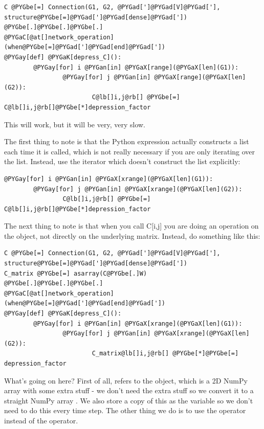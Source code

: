 \documentclass[letterpaper,10pt]{manual}
\begin{document}
\begin{Verbatim}[commandchars=@\[\]]
C @PYGbe[=] Connection(G1, G2, @PYGad[']@PYGad[V]@PYGad['], structure@PYGbe[=]@PYGad[']@PYGad[dense]@PYGad['])
@PYGbe[.]@PYGbe[.]@PYGbe[.]
@PYGaC[@at[]network_operation](when@PYGbe[=]@PYGad[']@PYGad[end]@PYGad['])
@PYGay[def] @PYGaK[depress_C]():
        @PYGay[for] i @PYGan[in] @PYGaX[range](@PYGaX[len](G1)):
                @PYGay[for] j @PYGan[in] @PYGaX[range](@PYGaX[len](G2)):
                        C@lb[]i,j@rb[] @PYGbe[=] C@lb[]i,j@rb[]@PYGbe[*]depression_factor
\end{Verbatim}

This will work, but it will be very, very slow.

The first thing to note is that the Python expression 
actually constructs a list \code{{[}0,1,2,...,N-1{]}} each time it is called,
which is not really necessary if you are only iterating over the list.
Instead, use the  iterator which doesn't construct the list
explicitly:

\begin{Verbatim}[commandchars=@\[\]]
@PYGay[for] i @PYGan[in] @PYGaX[xrange](@PYGaX[len](G1)):
        @PYGay[for] j @PYGan[in] @PYGaX[xrange](@PYGaX[len](G2)):
                C@lb[]i,j@rb[] @PYGbe[=] C@lb[]i,j@rb[]@PYGbe[*]depression_factor
\end{Verbatim}

The next thing to note is that when you call C{[}i,j{]} you are doing an
operation on the \hyperlink{brian.Connection}{} object, not directly on the underlying
matrix. Instead, do something like this:

\begin{Verbatim}[commandchars=@\[\]]
C @PYGbe[=] Connection(G1, G2, @PYGad[']@PYGad[V]@PYGad['], structure@PYGbe[=]@PYGad[']@PYGad[dense]@PYGad['])
C_matrix @PYGbe[=] asarray(C@PYGbe[.]W)
@PYGbe[.]@PYGbe[.]@PYGbe[.]
@PYGaC[@at[]network_operation](when@PYGbe[=]@PYGad[']@PYGad[end]@PYGad['])
@PYGay[def] @PYGaK[depress_C]():
        @PYGay[for] i @PYGan[in] @PYGaX[xrange](@PYGaX[len](G1)):
                @PYGay[for] j @PYGan[in] @PYGaX[xrange](@PYGaX[len](G2)):
                        C_matrix@lb[]i,j@rb[] @PYGbe[*]@PYGbe[=] depression_factor
\end{Verbatim}

What's going on here? First of all,  refers to the 
object, which is a 2D NumPy array with some extra stuff - we don't need the extra
stuff so we convert it to a straight NumPy array . We also store
a copy of this as the variable  so we don't need to do this every
time step. The other thing we do is to use the \code{*=} operator instead of the \code{*}
operator.
\end{document}
